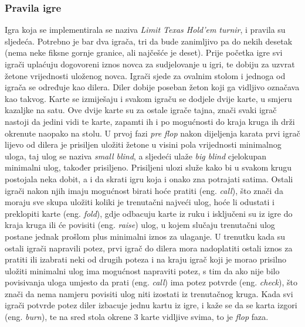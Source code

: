 \subsubsection{Pravila igre}
Igra koja se implementirala se naziva \emph{Limit Texas Hold'em turnir}, i pravila su sljedeća. 
Potrebno je bar dva igrača, tri da bude zanimljivo pa do nekih desetak (nema neke fiksne gornje granice, 
ali najčešće je deset). Prije početka igre svi igrači uplaćuju dogovoreni iznos novca za sudjelovanje u igri, te dobiju za uzvrat žetone vrijednosti uloženog novca. Igrači sjede za ovalnim stolom i jednoga od igrača se određuje kao dilera. Diler dobije poseban žeton koji ga vidljivo označava kao takvog. Karte se izmiješaju i svakom igraču se dodjele dvije karte, u smjeru kazaljke na satu. Ove dvije karte su za ostale igrače tajna, znači svaki igrač nastoji da jedini vidi te karte, zapamti ih i po mogućnosti do kraja kruga ih drži okrenute naopako na stolu. U prvoj fazi \emph{pre flop} nakon dijeljenja karata prvi igrač lijevo od dilera je prisiljen uložiti žetone u visini pola vrijednosti minimalnog uloga, taj ulog se naziva \emph{small blind}, a sljedeći ulaže \emph{big blind} cjelokupan minimalni ulog, također prisiljeno. Prisiljeni ulozi služe kako bi u svakom krugu postojala neka dobit, a i da skrati igru koja i onako zna potrajati satima. Ostali igrači nakon njih imaju mogućnost birati hoće pratiti (eng. \textit{call}), što znači da moraju sve skupa uložiti koliki je trenutačni najveći ulog, hoće li odustati i preklopiti karte (eng. \textit{fold}), gdje odbacuju karte iz ruku i isključeni su iz igre do kraja kruga ili će povisiti (eng. \textit{raise}) ulog, u kojem slučaju trenutačni ulog postane jednak prošlom plus minimalni iznos za ulaganje. U trenutku kada su ostali igrači napravili potez, prvi igrač do dilera mora nadoplatiti ostali iznos za pratiti ili izabrati neki od drugih poteza i na kraju igrač koji je morao prisilno uložiti minimalni ulog ima mogućnost napraviti potez, s tim da ako nije bilo povisivanja uloga umjesto da prati (eng. \textit{call}) ima potez potvrde (eng. \textit{check}), što znači da nema namjeru povisiti ulog niti izostati iz trenutačnog kruga. Kada svi igrači potvrde potez diler izbacuje jednu kartu iz igre, i kaže se da se karta izgori (eng. \textit{burn}), te na sred stola okrene 3 karte vidljive svima, to je \emph{flop} faza. 

